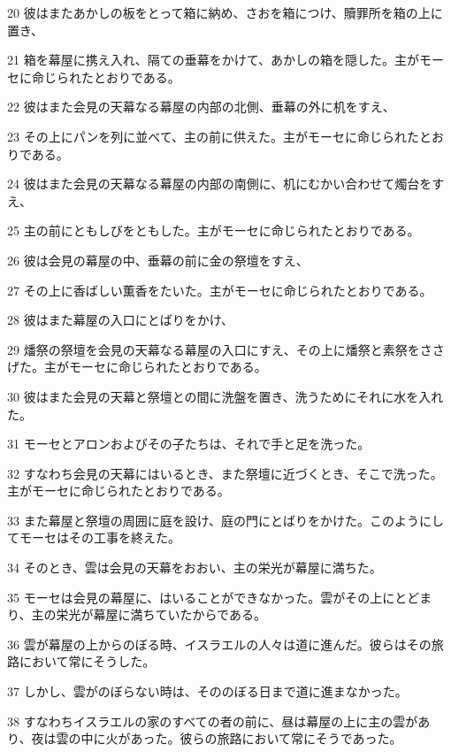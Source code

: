 \par 20 彼はまたあかしの板をとって箱に納め、さおを箱につけ、贖罪所を箱の上に置き、
\par 21 箱を幕屋に携え入れ、隔ての垂幕をかけて、あかしの箱を隠した。主がモーセに命じられたとおりである。
\par 22 彼はまた会見の天幕なる幕屋の内部の北側、垂幕の外に机をすえ、
\par 23 その上にパンを列に並べて、主の前に供えた。主がモーセに命じられたとおりである。
\par 24 彼はまた会見の天幕なる幕屋の内部の南側に、机にむかい合わせて燭台をすえ、
\par 25 主の前にともしびをともした。主がモーセに命じられたとおりである。
\par 26 彼は会見の幕屋の中、垂幕の前に金の祭壇をすえ、
\par 27 その上に香ばしい薫香をたいた。主がモーセに命じられたとおりである。
\par 28 彼はまた幕屋の入口にとばりをかけ、
\par 29 燔祭の祭壇を会見の天幕なる幕屋の入口にすえ、その上に燔祭と素祭をささげた。主がモーセに命じられたとおりである。
\par 30 彼はまた会見の天幕と祭壇との間に洗盤を置き、洗うためにそれに水を入れた。
\par 31 モーセとアロンおよびその子たちは、それで手と足を洗った。
\par 32 すなわち会見の天幕にはいるとき、また祭壇に近づくとき、そこで洗った。主がモーセに命じられたとおりである。
\par 33 また幕屋と祭壇の周囲に庭を設け、庭の門にとばりをかけた。このようにしてモーセはその工事を終えた。
\par 34 そのとき、雲は会見の天幕をおおい、主の栄光が幕屋に満ちた。
\par 35 モーセは会見の幕屋に、はいることができなかった。雲がその上にとどまり、主の栄光が幕屋に満ちていたからである。
\par 36 雲が幕屋の上からのぼる時、イスラエルの人々は道に進んだ。彼らはその旅路において常にそうした。
\par 37 しかし、雲がのぼらない時は、そののぼる日まで道に進まなかった。
\par 38 すなわちイスラエルの家のすべての者の前に、昼は幕屋の上に主の雲があり、夜は雲の中に火があった。彼らの旅路において常にそうであった。


